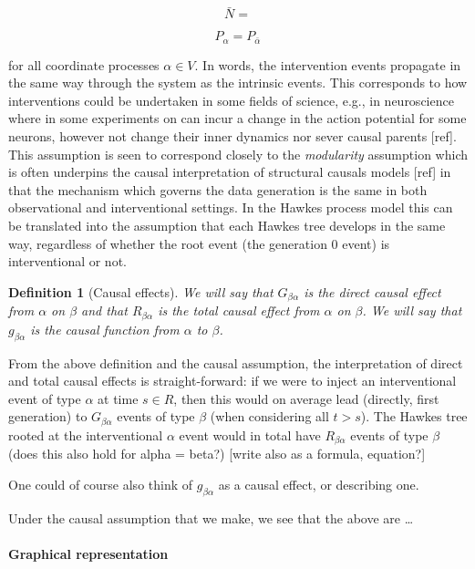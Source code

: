 \documentclass[accepted]{uai2021} %
\newtheorem{defn}[thm]{Definition}
\begin{document}
$$
\bar{N} = 
$$

$$
P_\alpha = P_{\bar{\alpha}}
$$

for all coordinate processes $\alpha \in V$. In words, the intervention events 
propagate in the same way through the system as the intrinsic events. This 
corresponds to how interventions could be undertaken in some fields of science, 
e.g., in neuroscience where in some experiments on can incur a change in the 
action potential for some neurons, however not change their inner dynamics nor 
sever causal parents [ref]. This assumption is seen to correspond closely to 
the \emph{modularity} assumption which is often underpins the causal 
interpretation of structural causals models [ref] in that the mechanism which 
governs the data generation is the same in both observational and 
interventional settings. In the Hawkes process model this can be translated 
into the assumption that each Hawkes tree develops in the same way, regardless 
of whether the root event (the generation 0 event) is interventional or not.

\begin{defn}[Causal effects]
	We will say that $G_{\beta\alpha}$ is the {\it direct causal effect} from 
	$\alpha$ on $\beta$ and that $R_{\beta\alpha}$ is the {\it total causal 
	effect} from $\alpha$ on $\beta$. We will say that $g_{\beta\alpha}$ is the 
	{\it causal function} from $\alpha$ to $\beta$.
	\label{def:cauEff}
\end{defn}

From the above definition and the causal assumption, the interpretation of 
direct and total causal effects is straight-forward: if we were to inject an 
interventional event of type $\alpha$ at time $s \in R$, then this 
would on average lead (directly, first generation) to $G_{\beta\alpha}$ events 
of type $\beta$ (when considering all $t > s$). The Hawkes tree rooted at the 
interventional $\alpha$ event would in total have $R_{\beta\alpha}$ events of 
type $\beta$ (does this also hold for alpha = beta?) [write also as a formula, 
equation?]

One could of course also think of $g_{\beta\alpha}$ as a causal effect, or 
describing one.

Under the causal assumption that we make, we see that the above are \ldots


\paragraph{Graphical representation}
\end{document}
